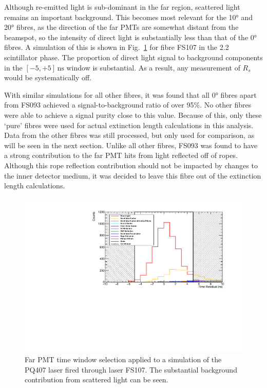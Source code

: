 Although re-emitted light is sub-dominant in the far region, scattered light remains an important background. This becomes most relevant for the \ang{10} and \ang{20} fibres, as the direction of the far PMTs are somewhat distant from the beamspot, so the intensity of direct light is substantially less than that of the \ang{0} fibres. A simulation of this is shown in Fig.~\ref{fig:smellie_PQ407_FS107_far_pmts_components} for fibre FS107 in the \SI{2.2}{\gpl} scintillator phase. The proportion of direct light signal to background components in the $[-5,+5]\,\si{\ns}$ window is substantial. As a result, any measurement of $R_{s}$ would be systematically off. %

With similar simulations for all other fibres, it was found that all \ang{0} fibres apart from FS093 achieved a signal-to-background ratio of over 95\%. No other fibres were able to achieve a signal purity close to this value. Because of this, only these `pure' fibres were used for actual extinction length calculations in this analysis. Data from the other fibres was still processed, but only used for comparison, as will be seen in the next section. Unlike all other fibres, FS093 was found to have a strong contribution to the far PMT hits from light reflected off of ropes. Although this rope reflection contribution should not be impacted by changes to the inner detector medium, it was decided to leave this fibre out of the extinction length calculations.

\begin{figure}
    \centering
    \includegraphics[width=\textwidth]{5_SMELLIEAnalysis/images/far_pmts_tres_components_nice_PQ407_FS107.pdf}
    \caption[]
    {Far PMT time window selection applied to a simulation of the PQ407 laser fired through laser FS107. The substantial background contribution from scattered light can be seen.}
    \label{fig:smellie_PQ407_FS107_far_pmts_components}
\end{figure}

